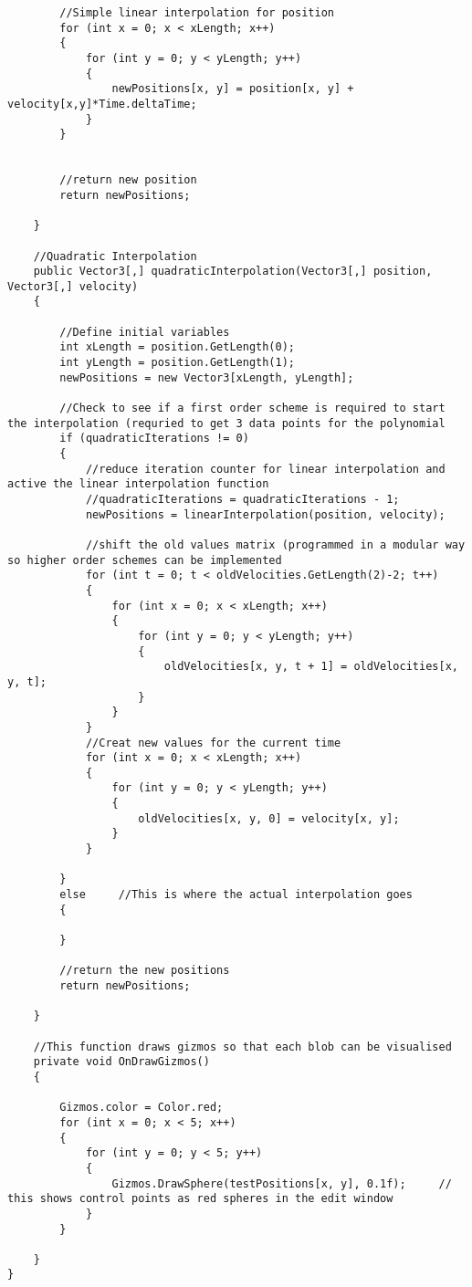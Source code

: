 \begin{mdframed}[linecolor=black, topline=true, bottomline=true,
  leftline=false, rightline=false]
\begin{verbatim}
        //Simple linear interpolation for position
        for (int x = 0; x < xLength; x++)
        {
            for (int y = 0; y < yLength; y++)
            {
                newPositions[x, y] = position[x, y] + velocity[x,y]*Time.deltaTime;
            }
        }


        //return new position
        return newPositions;

    }

    //Quadratic Interpolation
    public Vector3[,] quadraticInterpolation(Vector3[,] position, Vector3[,] velocity)
    {

        //Define initial variables
        int xLength = position.GetLength(0);
        int yLength = position.GetLength(1);
        newPositions = new Vector3[xLength, yLength];

        //Check to see if a first order scheme is required to start the interpolation (requried to get 3 data points for the polynomial
        if (quadraticIterations != 0)
        {
            //reduce iteration counter for linear interpolation and active the linear interpolation function
            //quadraticIterations = quadraticIterations - 1;
            newPositions = linearInterpolation(position, velocity);

            //shift the old values matrix (programmed in a modular way so higher order schemes can be implemented
            for (int t = 0; t < oldVelocities.GetLength(2)-2; t++)
            {
                for (int x = 0; x < xLength; x++)
                {
                    for (int y = 0; y < yLength; y++)
                    {
                        oldVelocities[x, y, t + 1] = oldVelocities[x, y, t];
                    }
                }
            }
            //Creat new values for the current time
            for (int x = 0; x < xLength; x++)
            {
                for (int y = 0; y < yLength; y++)
                {
                    oldVelocities[x, y, 0] = velocity[x, y];
                }                
            }

        }
        else     //This is where the actual interpolation goes
        {

        }

        //return the new positions
        return newPositions;

    }

    //This function draws gizmos so that each blob can be visualised 
    private void OnDrawGizmos()
    {

        Gizmos.color = Color.red;
        for (int x = 0; x < 5; x++)
        {
            for (int y = 0; y < 5; y++)
            {
                Gizmos.DrawSphere(testPositions[x, y], 0.1f);     // this shows control points as red spheres in the edit window
            }
        }

    }
}

\end{verbatim}
\end{mdframed}